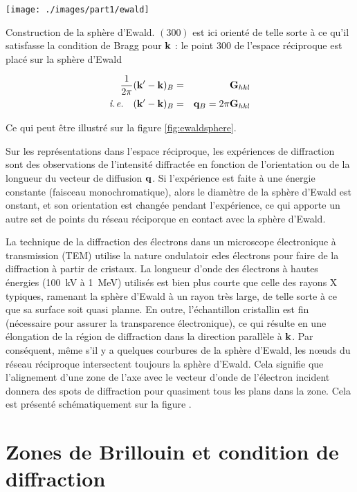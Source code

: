 \begin{marginfigure}
    \texttt{[image: ./images/part1/ewald]}
    \caption{Construction de la sphère d'Ewald. $(300)$ est ici orienté de telle sorte à ce qu'il satisfasse la condition de Bragg pour $\mathbf{k}$ : le point $300$ de l'espace réciproque est placé sur la sphère d'Ewald}
    \label{fig:ewaldsphere}
\end{marginfigure}
\begin{eqnarray}
    \frac{1}{2\pi} (\mathbf{k'-k})_B & = & \mathbf{G}_{hkl}\\
    \textit{i.\hspace{1pt}{}e.}\quad(\mathbf{k'-k})_B & = & \mathbf{q}_B  =  2 \pi \mathbf{G}_{hkl}
\end{eqnarray}

Ce qui peut être illustré sur la figure \ref{fig:ewaldsphere}.

Sur les représentations dans l'espace réciproque, les expériences de diffraction
sont des observations de l'intensité diffractée en fonction de l'orientation
ou de la longueur du vecteur de diffusion $\mathbf{q}$. Si l'expérience est faite
à une énergie constante (faisceau monochromatique), alors le diamètre de la
sphère d'Ewald est onstant, et son orientation est changée pendant l'expérience,
ce qui apporte un autre set de points du réseau réciporque en contact avec la
sphère d'Ewald.

La technique de la diffraction des électrons dans un microscope électronique à
transmission (TEM) utilise la nature ondulatoir edes électrons pour faire de la
diffraction à partir de cristaux. La longueur d'onde des électrons à hautes
énergies (\SI{100}{\kilo\volt} à \SI{1}{\mega\electronvolt}) utilisés est bien
plus courte que celle des rayons X typiques, ramenant la sphère d'Ewald à un
rayon très large, de telle sorte à ce que sa surface soit quasi planne.
En outre, l'échantillon cristallin est fin (nécessaire pour assurer la
transparence électronique), ce qui résulte en une élongation de la région de
diffraction dans la direction parallèle à $\mathbf{k}$.
Par conséquent, même s'il y a quelques courbures de la sphère d'Ewald, les nœuds
du réseau réciproque intersectent toujours la sphère d'Ewald. Cela signifie que
l'alignement d'une zone de l'axe avec le vecteur d'onde de l'électron
incident donnera des spots de diffraction pour quasiment tous les plans dans la
zone. Cela est présenté schématiquement sur la figure \TODO.



\section{Zones de Brillouin et condition de diffraction}

